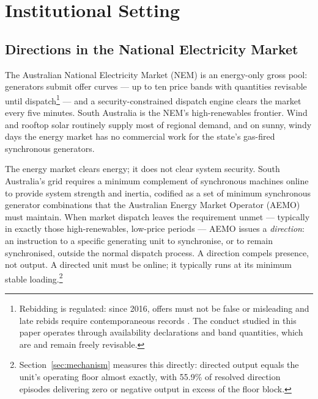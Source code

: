 \section{Institutional Setting}\label{sec:setting}

\subsection{Directions in the National Electricity Market}

The Australian National Electricity Market (NEM) is an energy-only gross pool:
generators submit offer curves --- up to ten price bands with quantities revisable
until dispatch\footnote{Rebidding is regulated: since 2016, offers must not
be false or misleading and late rebids require contemporaneous records
\citep{AEMC2015_goodfaith}. The conduct studied in this paper operates
through availability declarations and band quantities, which are and remain
freely revisable.} --- and a security-constrained dispatch engine clears the market
every five minutes. South Australia is the NEM's high-renewables frontier. Wind
and rooftop solar routinely supply most of regional demand, and on sunny, windy
days the energy market has no commercial work for the state's gas-fired
synchronous generators.

The energy market clears energy; it does not clear system security. South
Australia's grid requires a minimum complement of synchronous machines online to
provide system strength and inertia, codified as a set of minimum synchronous
generator combinations that the Australian Energy Market Operator (AEMO) must
maintain. When market dispatch leaves the requirement unmet --- typically in
exactly those high-renewables, low-price periods --- AEMO issues a
\emph{direction}: an instruction to a specific generating unit to synchronise,
or to remain synchronised, outside the normal dispatch process. A direction
compels presence, not output. A directed unit must be online; it typically runs
at its minimum stable loading.\footnote{Section~\ref{sec:mechanism} measures
this directly: directed output equals the unit's operating floor almost
exactly, with 55.9\% of resolved direction episodes delivering zero or negative
output in excess of the floor block.}

